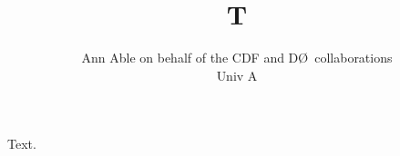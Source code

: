 \documentclass{article}
\begin{document}
\title{T}
\author{Ann Able on behalf of the CDF and D\O \ collaborations \\ Univ A}
\maketitle
Text.
\end{document}
